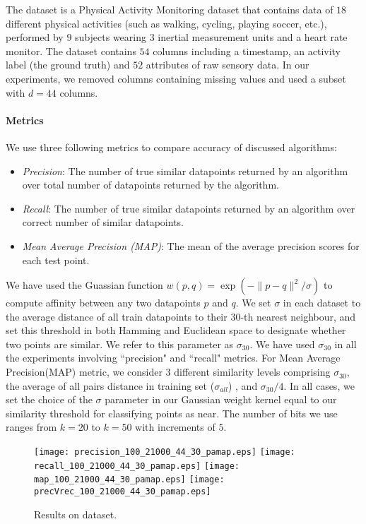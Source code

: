 \documentclass{sig-alternate}
\newlength{\figsize} \setlength{\figsize}{0.22\textwidth}
\begin{document}
The \cite{reiss2012introducing} dataset is a Physical Activity Monitoring dataset that contains data of $18$ different physical activities (such as walking, cycling, playing soccer, etc.), performed by $9$ subjects wearing $3$ inertial measurement units and a heart rate monitor. The dataset contains $54$ columns including a timestamp, an activity label (the ground truth) and $52$ attributes of raw sensory data. In our experiments, we removed columns containing missing values and used a subset with $d = 44$ columns.

\paragraph{Metrics}
We use three following metrics to compare accuracy of discussed algorithms:
\begin{itemize}
\item \textit{Precision}: The number of true similar datapoints returned by an algorithm over total number of datapoints returned by the algorithm.
\item \textit{Recall}: The number of true similar datapoints returned by an algorithm over correct number of similar datapoints.
\item \textit{Mean Average Precision (MAP)}: The mean of the average precision scores for each test point.
\end{itemize}

We have used the Guassian function $w(p,q) = \exp(-\|p-q\|^2/\sigma)$ to compute affinity between any two datapoints $p$ and $q$. We set $\sigma$ in each dataset to the average distance of all train datapoints to their $30$-th nearest neighbour, and set this threshold in both Hamming and Euclidean space to designate whether two points are similar. We refer to this parameter as $\sigma_{30}$. We have used $\sigma_{30}$ in all the experiments involving ``precision" and ``recall" metrics. 
For Mean Average Precision(MAP) metric, we consider $3$ different similarity levels comprising $\sigma_{30}$, the average of all pairs distance in training set ($\sigma_{all}$) , and $\sigma_{30} / 4$. In all cases, we set the choice of the $\sigma$ parameter in our Gaussian weight kernel equal to our similarity threshold for classifying points as near. The number of bits we use ranges from $k = 20$ to $k=50$ with increments of $5$.



\begin{figure}[t!]
\begin{centering}
\texttt{[image: precision\_100\_21000\_44\_30\_pamap.eps]}
\texttt{[image: recall\_100\_21000\_44\_30\_pamap.eps]}
\texttt{[image: map\_100\_21000\_44\_30\_pamap.eps]}
\texttt{[image: precVrec\_100\_21000\_44\_30\_pamap.eps]}
\vspace{-3mm}
\caption{\label{fig:pamap}
Results on  dataset.}  
\vspace{-2mm}
\end{centering}
\end{figure}
\end{document}

